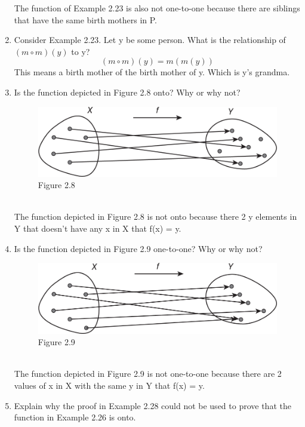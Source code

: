 \documentclass[12pt]{article}
\begin{document}
\begin{enumerate}
      The function of Example 2.23 is also not one-to-one because there are siblings that have the same birth mothers in P.
      \newpage
      \item Consider Example 2.23. Let y be some person. What is the relationship of $(m \circ m) (y)$ to y?
      \[(m \circ m) (y) = m(m(y))\]
      This means a birth mother of the birth mother of y. Which is y's grandma.
      \item Is the function depicted in Figure 2.8 onto? Why or why not?\\
      \begin{figure}[ht]
            \centering
                 \includegraphics[width=1.0\textwidth]{img/Figure2-8.png}
                  Figure 2.8
                  \label{normal_case}
      \end{figure}\\
      The function depicted in Figure 2.8 is not onto because there 2 y elements in Y that doesn't have any x in X that f(x) = y.
      \item Is the function depicted in Figure 2.9 one-to-one? Why or why not?\\
      \begin{figure}[ht]
            \centering
                 \includegraphics[width=1.0\textwidth]{img/Figure2-9.png}
                  Figure 2.9
                  \label{normal_case}
      \end{figure}\\
      The function depicted in Figure 2.9 is not one-to-one because there are 2 values of x in X with the same y in Y that f(x) = y.
      \item Explain why the proof in Example 2.28 could not be used to prove that the function in Example 2.26 is onto.\\

\end{enumerate}
\end{document}
